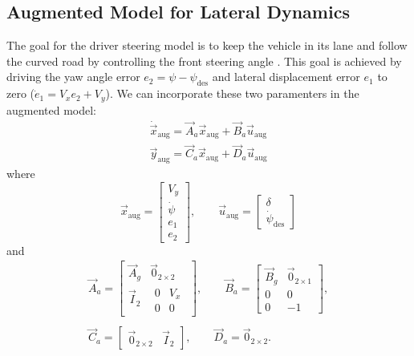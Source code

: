 \subsection{Augmented Model for Lateral Dynamics}
The goal for the driver steering model is to keep the vehicle in its lane and follow the curved road by controlling the front steering angle . This goal is achieved by driving the yaw angle error $e_2 = \psi -\psi_{\text{des}}$ and lateral displacement error $e_1$ to zero ($\dot{e}_1 = V_xe_2+V_y$). We can incorporate these two paramenters in the augmented model:
\begin{equation}
\label{eqn:lateral_dynamics_augmented_model}
\begin{array}{ll}
\dot{\vec{x}}_{\text{aug}} =\vec{A}_a \vec{x}_{\text{aug}}+ \vec{B}_a \vec{u}_{\text{aug}}\\
\vec{y}_{\text{aug}} = \vec{C}_a \vec{x}_{\text{aug}} + \vec{D}_a \vec{u}_{\text{aug}}
\end{array}
\end{equation}
where
\begin{equation}
\vec{x}_{\text{aug}} = \begin{bmatrix}
V_y\\\dot{\psi}\\e_1\\e_2
\end{bmatrix},
\qquad
\vec{u}_{\text{aug}} = 
\begin{bmatrix}
\delta\\\dot{\psi}_{\text{des}}
\end{bmatrix}
\end{equation}
and
\begin{equation}
\begin{array}{cc} 
\vec{A}_a=\begin{bmatrix}
\vec{A}_g&\vec{0}_{2\times2}\\
\vec{I}_2&\begin{matrix}
0&V_x\\
0&0
\end{matrix}
\end{bmatrix},
\qquad
\vec{B}_a=\begin{bmatrix}
\vec{B}_g&\vec{0}_{2\times1}\\
0&0\\
0&-1
\end{bmatrix},
\\\\
\vec{C}_a=\begin{bmatrix}
\vec{0}_{2\times2}&\vec{I}_2
\end{bmatrix}, 
\qquad
\vec{D}_a=
\vec{0}_{2\times2}. 
\end{array}
\end{equation}

